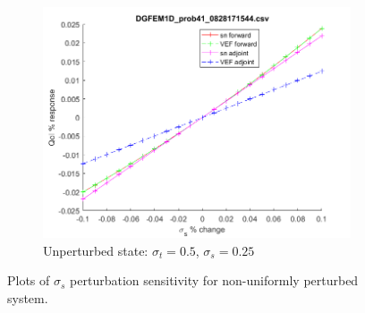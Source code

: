 \documentclass{article}
\newcommand{\sigt}{\sigma_t}
\newcommand{\sigs}{\sigma_s}
\begin{document}
\begin{figure}[H]
\begin{subfigure}{.65\textwidth}
  \centering
  \includegraphics[width=.98\linewidth]{figures/41sigsSens.png}
  \caption{Unperturbed state: $\sigt=0.5$, $\sigs=0.25$}
  \label{fig:sfig3}
\end{subfigure}
\caption{Plots of $\sigs$ perturbation sensitivity for non-uniformly perturbed system.}
\label{fig:fig}
\end{figure}
\end{document}
